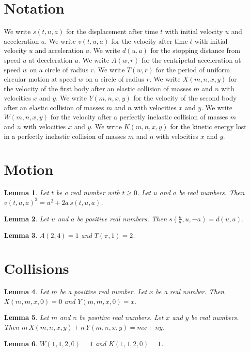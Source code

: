 \documentclass{article}
\newtheorem{lemma}{Lemma}
\begin{document}
\section{Notation}

We write $s(t,u,a)$ for the displacement after time $t$ with initial velocity $u$ and acceleration $a$.
We write $v(t,u,a)$ for the velocity after time $t$ with initial velocity $u$ and acceleration $a$.
We write $d(u,a)$ for the stopping distance from speed $u$ at deceleration $a$.
We write $A(w,r)$ for the centripetal acceleration at speed $w$ on a circle of radius $r$.
We write $T(w,r)$ for the period of uniform circular motion at speed $w$ on a circle of radius $r$.
We write $X(m,n,x,y)$ for the velocity of the first body after an elastic collision of masses $m$ and $n$ with velocities $x$ and $y$.
We write $Y(m,n,x,y)$ for the velocity of the second body after an elastic collision of masses $m$ and $n$ with velocities $x$ and $y$.
We write $W(m,n,x,y)$ for the velocity after a perfectly inelastic collision of masses $m$ and $n$ with velocities $x$ and $y$.
We write $K(m,n,x,y)$ for the kinetic energy lost in a perfectly inelastic collision of masses $m$ and $n$ with velocities $x$ and $y$.

\section{Motion}

\begin{lemma}\label{suvat}
Let $t$ be a real number with $t\ge0$. Let $u$ and $a$ be real numbers. Then $v(t,u,a)^2=u^2+2a\,s(t,u,a)$.
\end{lemma}

\begin{lemma}\label{stopping}
Let $u$ and $a$ be positive real numbers. Then $s(\frac{u}{a},u,-a)=d(u,a)$.
\end{lemma}

\begin{lemma}\label{circle}
$A(2,4)=1$ and $T(\pi,1)=2$.
\end{lemma}

\section{Collisions}

\begin{lemma}\label{exchange}
Let $m$ be a positive real number. Let $x$ be a real number. Then $X(m,m,x,0)=0$ and $Y(m,m,x,0)=x$.
\end{lemma}

\begin{lemma}\label{momentum}
Let $m$ and $n$ be positive real numbers. Let $x$ and $y$ be real numbers. Then $m\,X(m,n,x,y)+n\,Y(m,n,x,y)=mx+ny$.
\end{lemma}

\begin{lemma}\label{inelastic}
$W(1,1,2,0)=1$ and $K(1,1,2,0)=1$.
\end{lemma}
\end{document}
